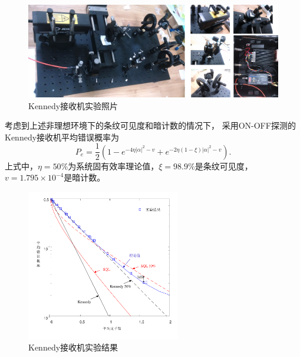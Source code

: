 \begin{figure}
\centering
  \includegraphics[width=\textwidth]{figures/chap5/experiment-photo}
  \caption{Kennedy接收机实验照片}
  \label{fig:experiment-photo}
\end{figure}

考虑到上述非理想环境下的条纹可见度和暗计数的情况下，
采用ON-OFF探测的Kennedy接收机平均错误概率为
\begin{equation}
P_e = \frac{1}{2}(1-e^{- 4 \eta |\alpha|^2 - v} + e^{- 2 \eta (1-\xi) |\alpha|^2 - v }).
\end{equation}
上式中，$\eta=50\%$为系统固有效率理论值，$\xi=98.9\%$是条纹可见度，$v=1.795\times 10^{-4}$是暗计数。

\begin{figure} %
\centering
  \includegraphics[width=0.6\textwidth]{figures/chap5/kennedy-experiment-error}
  \caption{Kennedy接收机实验结果}
  \label{fig:kennedy-experiment-error}
\end{figure}

